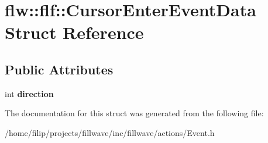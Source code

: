 \hypertarget{structflw_1_1flf_1_1CursorEnterEventData}{}\section{flw\+:\+:flf\+:\+:Cursor\+Enter\+Event\+Data Struct Reference}
\label{structflw_1_1flf_1_1CursorEnterEventData}
\subsection*{Public Attributes}
\begin{DoxyCompactItemize}
\item 
\mbox{\label{structflw_1_1flf_1_1CursorEnterEventData_a30ebfc482500e3cfaa542a67b1e644cc}} 
int {\bfseries direction}
\end{DoxyCompactItemize}


The documentation for this struct was generated from the following file\+:\begin{DoxyCompactItemize}
\item 
/home/filip/projects/fillwave/inc/fillwave/actions/Event.\+h\end{DoxyCompactItemize}
